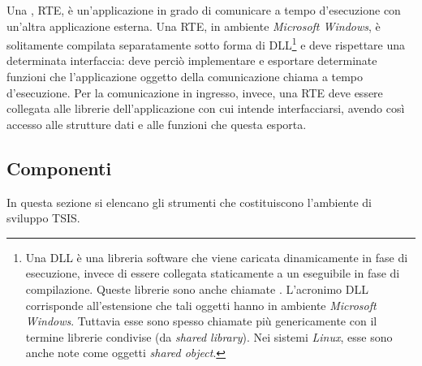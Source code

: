 \begin{definizione}\label{defn:rte}
Una , \acl{RTE}, è un'applicazione in grado di comunicare a tempo d'esecuzione con un'altra applicazione esterna. Una \acs{RTE}, in ambiente \emph{Microsoft Windows}, è solitamente compilata separatamente sotto forma di \acs{DLL}\footnote{Una \acf{DLL} è una libreria software che viene caricata dinamicamente in fase di esecuzione, invece di essere collegata staticamente a un eseguibile in fase di compilazione. Queste librerie sono anche chiamate . L'acronimo \acs{DLL} corrisponde all'estensione che tali oggetti hanno in ambiente \emph{Microsoft Windows}. Tuttavia esse sono spesso chiamate più genericamente con il termine librerie condivise (da \emph{shared library}). Nei sistemi \emph{Linux}, esse sono anche note come oggetti \emph{shared object}.} e deve rispettare una determinata interfaccia: deve perciò implementare e esportare determinate funzioni che l'applicazione oggetto della comunicazione chiama a tempo d'esecuzione. Per la comunicazione in ingresso, invece, una \acs{RTE} deve essere collegata alle librerie dell'applicazione con cui intende interfacciarsi, avendo così accesso alle strutture dati e alle funzioni che questa esporta.
\end{definizione}

\subsection{Componenti}\label{subsec:tsis-components}
In questa sezione si elencano gli strumenti che costituiscono l'ambiente di sviluppo \acs{TSIS}.

